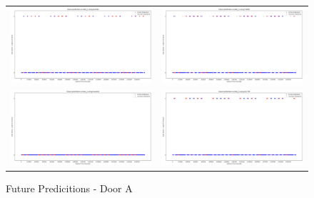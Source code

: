 \begin{figure}
  \begin{tabular}{cc}
    {\includegraphics[width = 3in]{images/results/Future_door_A_Duckett.png}} &
    {\includegraphics[width = 3in]{images/results/Future_door_A_FreMEn.png}} \\
    {\includegraphics[width = 3in]{images/results/Future_door_A_Gaussian.png}} &
    {\includegraphics[width = 3in]{images/results/Future_door_A_HyT-EM.png}} \\
  \end{tabular}
  \caption{Future Predicitions - Door A}
\end{figure} \\ \\

